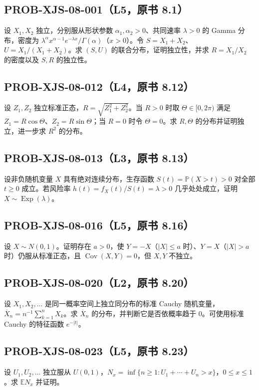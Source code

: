 \documentclass[UTF8]{ctexart}
\begin{document}
\subsection*{PROB-XJS-08-001（L5，原书 8.1）}
设 $X_1,X_2$ 独立，分别服从形状参数 $\alpha_1,\alpha_2>0$、共同速率 $\lambda>0$ 的 Gamma 分布，密度为 $\lambda^\alpha x^{\alpha-1}e^{-\lambda x}/\Gamma(\alpha)$（$x>0$）。令 $S=X_1+X_2$、$U=X_1/(X_1+X_2)$。求 $(S,U)$ 的联合分布，证明独立性，并求 $R=X_1/X_2$ 的密度以及 $S,R$ 的独立性。

\subsection*{PROB-XJS-08-012（L4，原书 8.12）}
设 $Z_1,Z_2$ 独立标准正态，$R=\sqrt{Z_1^2+Z_2^2}$。当 $R>0$ 时取 $\Theta\in[0,2\pi)$ 满足 $Z_1=R\cos\Theta$、$Z_2=R\sin\Theta$；当 $R=0$ 时令 $\Theta=0$。求 $R,\Theta$ 的分布并证明独立，进一步求 $R^2$ 的分布。

\subsection*{PROB-XJS-08-013（L3，原书 8.13）}
设非负随机变量 $X$ 具有绝对连续分布，生存函数 $S(t)=\mathbb P(X>t)>0$ 对全部 $t\ge0$ 成立。若风险率 $h(t)=f_X(t)/S(t)=\lambda>0$ 几乎处处成立，证明 $X\sim\operatorname{Exp}(\lambda)$。

\subsection*{PROB-XJS-08-016（L5，原书 8.16）}
设 $X\sim N(0,1)$。证明存在 $a>0$，使 $Y=-X$（$|X|\le a$ 时）、$Y=X$（$|X|>a$ 时）仍服从标准正态，且 $\operatorname{Cov}(X,Y)=0$，但 $X,Y$ 不独立。

\subsection*{PROB-XJS-08-020（L2，原书 8.20）}
设 $X_1,X_2,\ldots$ 是同一概率空间上独立同分布的标准 Cauchy 随机变量，$\overline X_n=n^{-1}\sum_{k=1}^nX_k$。求 $\overline X_n$ 的分布，并判断它是否依概率趋于 $0$。可使用标准 Cauchy 的特征函数 $e^{-|t|}$。

\subsection*{PROB-XJS-08-023（L5，原书 8.23）}
设 $U_1,U_2,\ldots$ 独立服从 $U(0,1)$，$N_x=\inf\{n\ge1:U_1+\cdots+U_n>x\}$，$0\le x\le1$。求 $\mathbb E N_x$ 并证明。
\end{document}
